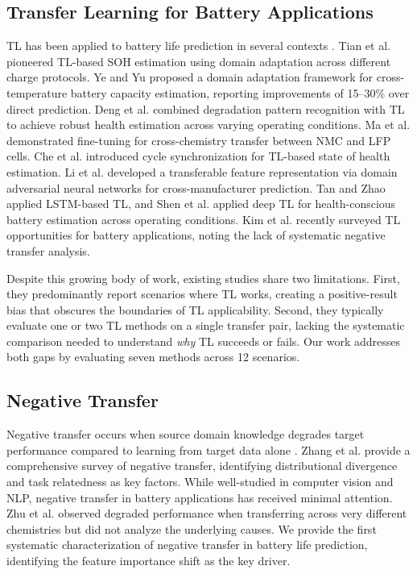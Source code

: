\documentclass[review]{elsarticle}
\begin{document}
\subsection{Transfer Learning for Battery Applications}

TL has been applied to battery life prediction in several contexts \cite{weiss2016survey}. Tian et al. \cite{tian2020transfer} pioneered TL-based SOH estimation using domain adaptation across different charge protocols. Ye and Yu \cite{ye2021cross} proposed a domain adaptation framework for cross-temperature battery capacity estimation, reporting improvements of 15--30\% over direct prediction. Deng et al. \cite{deng2022battery} combined degradation pattern recognition with TL to achieve robust health estimation across varying operating conditions. Ma et al. \cite{ma2022transfer} demonstrated fine-tuning for cross-chemistry transfer between NMC and LFP cells. Che et al. \cite{che2023transfer} introduced cycle synchronization for TL-based state of health estimation. Li et al. \cite{li2023transferable} developed a transferable feature representation via domain adversarial neural networks for cross-manufacturer prediction. Tan and Zhao \cite{tan2023transfer} applied LSTM-based TL, and Shen et al. \cite{shen2022health} applied deep TL for health-conscious battery estimation across operating conditions. Kim et al. \cite{kim2024battery} recently surveyed TL opportunities for battery applications, noting the lack of systematic negative transfer analysis.

Despite this growing body of work, existing studies share two limitations. First, they predominantly report scenarios where TL works, creating a positive-result bias that obscures the boundaries of TL applicability. Second, they typically evaluate one or two TL methods on a single transfer pair, lacking the systematic comparison needed to understand \textit{why} TL succeeds or fails. Our work addresses both gaps by evaluating seven methods across 12 scenarios.

\subsection{Negative Transfer}

Negative transfer occurs when source domain knowledge degrades target performance compared to learning from target data alone \cite{wang2019characterizing}. Zhang et al. \cite{zhang2023negative} provide a comprehensive survey of negative transfer, identifying distributional divergence and task relatedness as key factors. While well-studied in computer vision and NLP, negative transfer in battery applications has received minimal attention. Zhu et al. \cite{zhu2022data} observed degraded performance when transferring across very different chemistries but did not analyze the underlying causes. We provide the first systematic characterization of negative transfer in battery life prediction, identifying the feature importance shift as the key driver.
\end{document}
